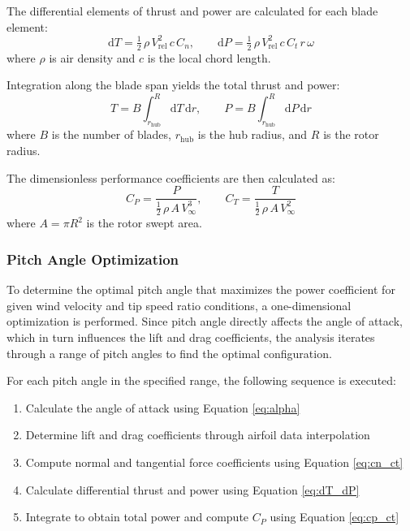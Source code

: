 \documentclass[11pt]{article}
\begin{document}
The differential elements of thrust and power are calculated for each blade element:
\begin{equation}
\mathrm{d}T = \tfrac{1}{2}\,\rho\,V_{\mathrm{rel}}^{2}\, c\, C_n, \qquad \mathrm{d}P = \tfrac{1}{2}\,\rho\,V_{\mathrm{rel}}^{2}\, c\, C_t\, r\,\omega
\label{eq:dT_dP}
\end{equation}
where $\rho$ is air density and $c$ is the local chord length.

Integration along the blade span yields the total thrust and power:
\begin{equation}
 T = B \int_{r_\text{hub}}^{R} \! \mathrm{d}T\,\mathrm{d}r, \qquad P = B \int_{r_\text{hub}}^{R} \! \mathrm{d}P\,\mathrm{d}r
\label{eq:integrals}
\end{equation}
where $B$ is the number of blades, $r_\text{hub}$ is the hub radius, and $R$ is the rotor radius.

The dimensionless performance coefficients are then calculated as:
\begin{equation}
 C_P = \frac{P}{\tfrac{1}{2}\,\rho\,A\,V_\infty^{3}}, \qquad C_T = \frac{T}{\tfrac{1}{2}\,\rho\,A\,V_\infty^{2}}
\label{eq:cp_ct}
\end{equation}
where $A = \pi R^{2}$ is the rotor swept area.

\subsubsection{Pitch Angle Optimization}

To determine the optimal pitch angle that maximizes the power coefficient for given wind velocity and tip speed ratio conditions, a one-dimensional optimization is performed. Since pitch angle directly affects the angle of attack, which in turn influences the lift and drag coefficients, the analysis iterates through a range of pitch angles to find the optimal configuration.

For each pitch angle in the specified range, the following sequence is executed:
\begin{enumerate}
    \item Calculate the angle of attack using Equation \eqref{eq:alpha}
    \item Determine lift and drag coefficients through airfoil data interpolation
    \item Compute normal and tangential force coefficients using Equation \eqref{eq:cn_ct}
    \item Calculate differential thrust and power using Equation \eqref{eq:dT_dP}
    \item Integrate to obtain total power and compute $C_P$ using Equation \eqref{eq:cp_ct}
\end{enumerate}
\end{document}
